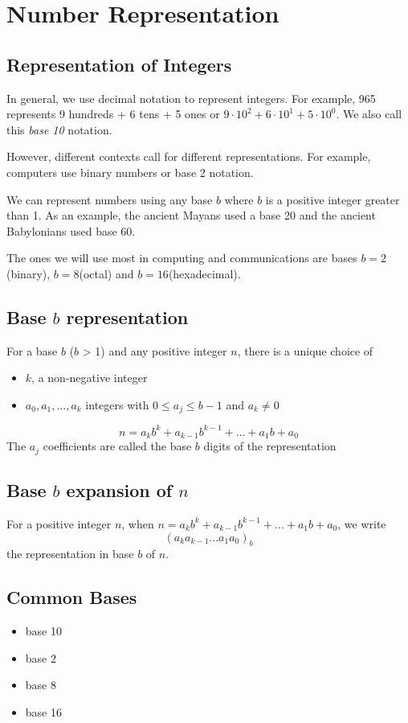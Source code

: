 \documentclass[10pt,a4paper]{book}
\begin{document}
\section{Number Representation}
\subsection{Representation of Integers}
In general, we use decimal notation to represent integers. For example, 965 represents 9 hundreds + 6 tens + 5 ones or $9\cdot 10^2+6\cdot 10^1+5\cdot 10^0$. We also call this \textit{base 10} notation.\par 
However, different contexts call for different representations. For example, computers use binary numbers or base 2 notation.\par 
We can represent numbers using any base $b$ where $b$ is a positive integer greater than 1. As an example, the ancient Mayans used a base 20 and the ancient Babylonians used base 60.\par 
The ones we will use most in computing and communications are bases $b=2$(binary), $b=8$(octal) and $b=16$(hexadecimal).
\subsection{Base $b$ representation}
For a base $b$ ($b$ > 1) and any positive integer $n$, there is a unique choice of 
\begin{itemize}
\item $k$, a non-negative integer
\item $a_0,a_1,...,a_k$ integers with $0 \leq a_j \leq b-1$ and $a_k \neq 0$
\end{itemize}
\[n=a_kb^k+a_{k-1}b^{k-1}+...+a_1b+a_0\]
The $a_j$ coefficients are called the base $b$ digits of the representation
\subsection{Base $b$ expansion of $n$}
For a positive integer $n$, when $n=a_{k}b^{k}+a_{k-1}b^{k-1}+...+a_1b+a_0$, we write \[(a_k a_{k-1} ... a_1 a_0)_b \] the representation in base $b$ of $n$.
\subsection{Common Bases}
\begin{itemize}
\item{ base 10}
\item{ base 2}
\item{ base 8}
\item{ base 16}
\end{itemize}
\end{document}
